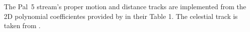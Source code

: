 The Pal~5 stream's proper motion and distance tracks are implemented from the 2D polynomial coefficientes provided by \citet{PriceWhelan2019_pal5} in their Table 1. The celestial track is taken from \citet{Bonaca2020}.

